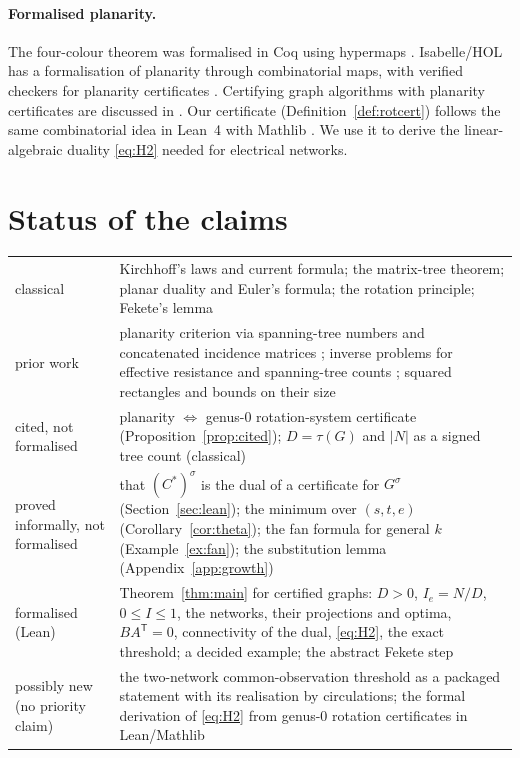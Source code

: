 \documentclass[11pt]{amsart}
\theoremstyle{plain}
\theoremstyle{definition}
\theoremstyle{remark}
\newcommand{\T}{\mathsf{T}}
\begin{document}
\paragraph{Formalised planarity.} The four-colour theorem was formalised in Coq using hypermaps
\cite{Gonthier2008}. Isabelle/HOL has a formalisation of planarity through combinatorial maps, with verified checkers
for planarity certificates \cite{NoschinskiAFP}. Certifying graph algorithms with planarity certificates are
discussed in \cite{AbdulazizMehlhornNipkow}. Our certificate (Definition~\ref{def:rotcert}) follows the same
combinatorial idea in Lean~4 with Mathlib \cite{mathlib,lean4}. We use it to derive the linear-algebraic duality
\eqref{eq:H2} needed for electrical networks.

\section{Status of the claims}\label{sec:status}

\begin{center}
\small
\begin{tabularx}{\linewidth}{l X}
\toprule
classical & Kirchhoff's laws and current formula; the matrix-tree theorem; planar duality and Euler's formula; the
rotation principle; Fekete's lemma\\
prior work & planarity criterion via spanning-tree numbers and concatenated incidence matrices \cite{BuPan}; inverse
problems for effective resistance and spanning-tree counts \cite{CKP25,CKP24}; squared rectangles and bounds on
their size \cite{BSST,Conway,Kenyon,Fomin,Keleti}\\
cited, not formalised & planarity $\Leftrightarrow$ genus-$0$ rotation-system certificate (Proposition~\ref{prop:cited});
$D=\tau(G)$ and $|N|$ as a signed tree count (classical)\\
proved informally, not formalised & that $(C^\ast)^\sigma$ is the dual of a certificate for $G^\sigma$
(Section~\ref{sec:lean}); the minimum over $(s,t,e)$ (Corollary~\ref{cor:theta}); the fan formula for general $k$
(Example~\ref{ex:fan}); the substitution lemma (Appendix~\ref{app:growth})\\
formalised (Lean) & Theorem~\ref{thm:main} for certified graphs: $D>0$, $I_e=N/D$, $0\le I\le1$, the networks,
their projections and optima, $BA^{\T}=0$, connectivity of the dual, \eqref{eq:H2}, the exact threshold; a decided
example; the abstract Fekete step\\
possibly new (no priority claim) & the two-network common-observation threshold as a packaged statement with its
realisation by circulations; the formal derivation of \eqref{eq:H2} from genus-$0$ rotation certificates in
Lean/Mathlib\\
\bottomrule
\end{tabularx}
\end{center}
\end{document}

